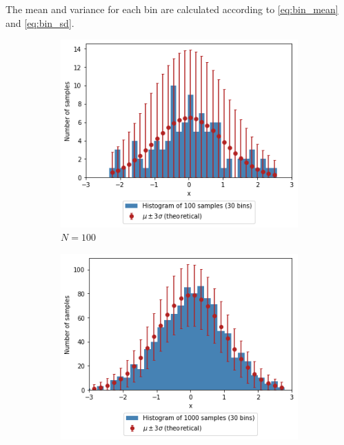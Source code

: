 \documentclass[a4paper]{article}
\begin{document}
The mean and variance for each bin are calculated according to \autoref{eq:bin_mean} and \autoref{eq:bin_sd}.

\begin{figure}[h]
    \centering
    \begin{subfigure}[b]{0.3\textwidth}
        \centering
        \includegraphics[width=\textwidth]{figures/gaussian_histogram_100.png}
        \caption{$N=100$}
        \label{fig:gaussian_histogram_100}
    \end{subfigure}
    \hfill
    \begin{subfigure}[b]{0.3\textwidth}
        \centering
        \includegraphics[width=\textwidth]{figures/gaussian_histogram_1000.png}

\end{subfigure}
\end{figure}
\end{document}
